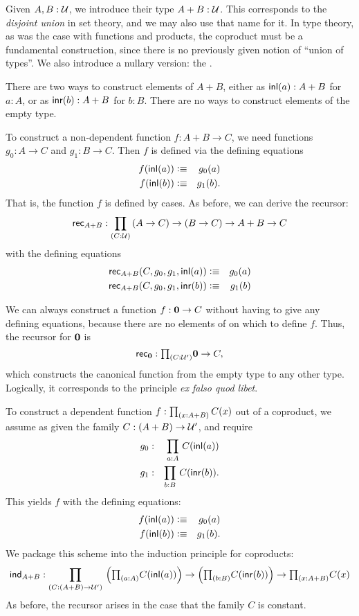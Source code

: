 Given $A,B:\mathcal{U}$, we introduce their  type $A+B:\mathcal{U}$.
This corresponds to the \emph{disjoint union} in set theory, and we may also use that name for it.
In type theory, as was the case with functions and products, the coproduct must be a fundamental construction, since there is no previously given notion of ``union of types''.
We also introduce a
nullary version: the .

There are two ways to construct elements of $A+B$, either as ${\mathsf{inl}}(a) : A+B$ for $a:A$, or as
${\mathsf{inr}}(b):A+B$ for $b:B$. There are no ways to construct elements of the empty type. 

To construct a non-dependent function $f : A+B \to C$, we need 
functions $g_0 : A \to C$ and $g_1 : B \to C$. Then $f$ is defined
via the defining equations
\begin{eqnarray*}
  f({\mathsf{inl}}(a)) & \vcentcolon\equiv & g_0(a) \\
  f({\mathsf{inl}}(b)) & \vcentcolon\equiv & g_1(b).
\end{eqnarray*}
That is, the function $f$ is defined by cases. As before, we can
derive the recursor:
\[ \rec{A+B} : \dprd{C:\UU}(A \to C) \to (B\to C) \to A+B \to C\]
with the defining equations
\begin{eqnarray*}
\mathsf{rec}_{A+B}(C,g_0,g_1,{\mathsf{inl}}(a)) & \vcentcolon\equiv & g_0(a) \\
\mathsf{rec}_{A+B}(C,g_0,g_1,{\mathsf{inr}}(b)) & \vcentcolon\equiv & g_1(b)
\end{eqnarray*}

We can always construct a function $f : \mathbf{0} \to C$ without
having to give any defining equations, because there are no elements of \emptyt on which to define $f$.
Thus, the recursor for $\mathbf{0}$ is
\[\rec{\emptyt} : \tprd{C:\UU'} \emptyt \to C,\]
which constructs the canonical function from the empty type to any other type.
Logically, it corresponds to the principle \emph{ex falso quod libet}. 

To construct a dependent function $f:\prd{x:A+B}C(x)$ out of a coproduct, we assume as given the family 
$C: (A + B) \to \mathcal{U}'$, and 
require 
\begin{eqnarray*}
  g_0 & : & \prd{a:A} C(\inl(a)) \\
  g_1 & : & \prd{b:B} C(\inr(b)).
\end{eqnarray*}
This yields $f$ with the defining equations:
\begin{eqnarray*}
  f({\mathsf{inl}}(a)) & \vcentcolon\equiv & g_0(a) \\
  f({\mathsf{inl}}(b)) & \vcentcolon\equiv & g_1(b) .
\end{eqnarray*}
We package this scheme into the induction principle for coproducts:
\begin{align*}
  \ind{A+B} :  \dprd{C: (A + B) \to \UU'}
  \Big(\tprd{a:A} C(\inl(a))\Big) \to \Big(\tprd{b:B} C(\inr(b))\Big)
  \to \tprd{x:A+B}C(x) 
\end{align*}
As before, the recursor arises in the case that the family $C$ is
constant. 

